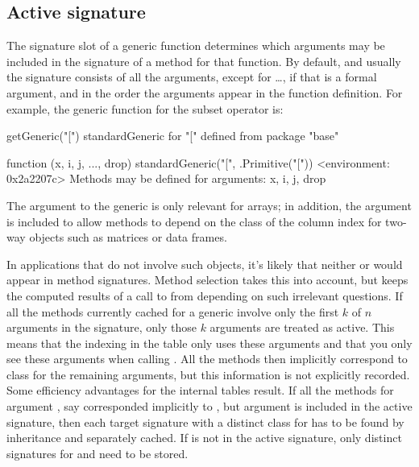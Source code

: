 \documentclass[11pt]{article}
\begin{document}
\subsection*{Active signature}
\label{sec:active-signature}

The signature slot of a generic function determines which arguments may be included in the signature of a method for that function.
By default, and usually the signature consists of all the arguments, except for \dots{}, if that is a formal argument, and in the order the arguments appear in the function definition.
For example, the generic function for the subset operator is:
\begin{Example}
\SPrompt{}getGeneric("[")
standardGeneric for "[" defined from package "base"

function (x, i, j, ..., drop) 
standardGeneric("[", .Primitive("["))
<environment: 0x2a2207c>
Methods may be defined for arguments: x, i, j, drop 
\end{Example}
The argument  to the generic is only relevant for arrays; in addition, the argument  is included to allow methods to depend on the class of the column index for two-way objects such as matrices or data frames.

In applications that do not involve such objects, it's likely that neither  or  would appear in method signatures.
Method selection takes this into account, but keeps the computed results of a call to \SOperator{[} from depending on such irrelevant questions.
If all the methods currently cached for a generic involve only the first $k$ of $n$ arguments in the signature, only those $k$ arguments are treated as active.
This means that the indexing in the table only uses these arguments and that you only see these arguments when calling .
All the methods then implicitly correspond to class  for the remaining arguments, but this information is not explicitly recorded.
Some efficiency advantages for the internal tables result.
If all the methods for argument , say corresponded implicitly to , but argument  is included in the active signature, then each target signature with a distinct class for  has to be found by inheritance and separately cached.
If  is not in the active signature, only distinct signatures for  and  need to be stored.
\end{document}
